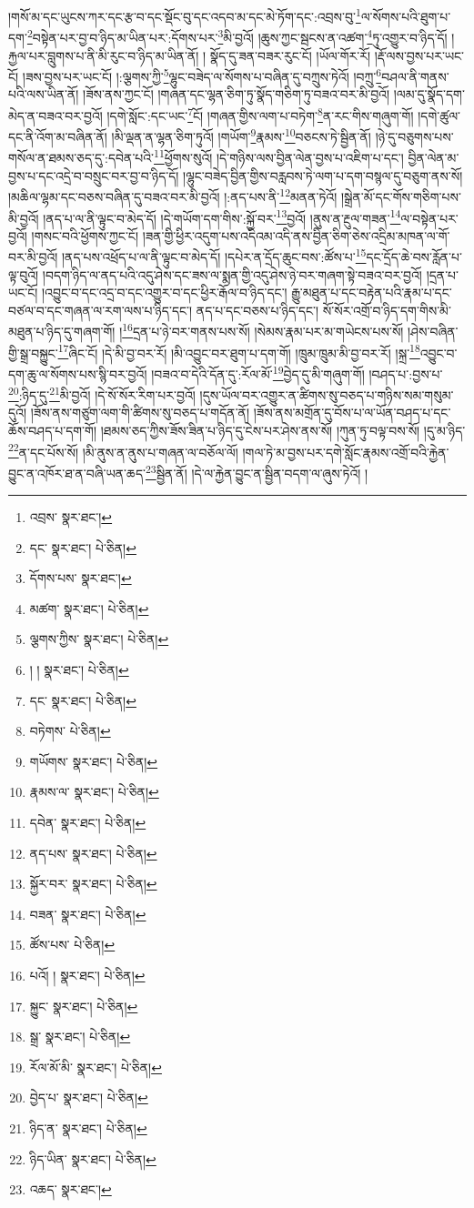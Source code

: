 །གསོ་མ་དང་ཡུངས་ཀར་དང་རྩ་བ་དང་སྡོང་བུ་དང་འདབ་མ་དང་མེ་ཏོག་དང་:འབྲས་བུ་\footnote{འབྲས་  སྣར་ཐང་། }ལ་སོགས་པའི་ཐུག་པ་དག་\footnote{དང་  སྣར་ཐང་།  པེ་ཅིན། }བསྟེན་པར་བྱ་བ་ཉིད་མ་ཡིན་པར་:དོགས་པར་\footnote{དོགས་པས་  སྣར་ཐང་། }མི་བྱའོ། །ཆུས་ཀྱང་སྦངས་ན་འཚག་\footnote{མཚག་  སྣར་ཐང་།  པེ་ཅིན། }ཏུ་འགྱུར་བ་ཉིད་དོ། །རྐྱལ་པར་བླུགས་པ་ནི་མི་རུང་བ་ཉིད་མ་ཡིན་ནོ། །
སྣོད་དུ་ཟན་བཟར་རུང་ངོ། །ཡོལ་གོར་རོ། །རྡོ་ལས་བྱས་པར་ཡང་ངོ། །ཟས་བྱས་པར་ཡང་ངོ། །:ལྕགས་ཀྱི་\footnote{ལྕགས་ཀྱིས་  སྣར་ཐང་།  པེ་ཅིན། }ལྷུང་བཟེད་ལ་སོགས་པ་བཞིན་དུ་བཀྲུས་ཏེའོ། །བཀྲུ་\footnote{། །  སྣར་ཐང་།  པེ་ཅིན། }བཤལ་ནི་གནས་པའི་ལས་ཡིན་ནོ། །ཟོས་ནས་ཀྱང་ངོ། །གཞན་དང་ལྷན་ཅིག་ཏུ་སྣོད་གཅིག་ཏུ་བཟའ་བར་མི་བྱའོ། །ལམ་དུ་སྣོད་དག་མེད་ན་བཟའ་བར་བྱའོ། །དགེ་སློང་:དང་ཡང་\footnote{དང་  སྣར་ཐང་།  པེ་ཅིན། }ངོ། །གཞན་གྱིས་ལག་པ་བཏེག་\footnote{བཏེགས་  པེ་ཅིན། }ན་རང་གིས་གཞུག་གོ། །དགེ་ཚུལ་དང་ནི་འོག་མ་བཞིན་ནོ། །མི་ལྡན་ན་ལྷན་ཅིག་ཏུའོ། །གཡོག་\footnote{གཡོགས་  སྣར་ཐང་།  པེ་ཅིན། }རྣམས་\footnote{རྣམས་ལ་  སྣར་ཐང་།  པེ་ཅིན། }བཅངས་ཏེ་སྦྱིན་ནོ། །ཉེ་དུ་བཅུགས་པས་གསོལ་ན་ཐམས་ཅད་དུ་:དབེན་པའི་\footnote{དབེན་  སྣར་ཐང་།  པེ་ཅིན། }ཕྱོགས་སུའོ། །དེ་གཉིས་ལས་བྱིན་ལེན་བྱས་པ་འཇིག་པ་དང་། བྱིན་ལེན་མ་བྱས་པ་དང་འདྲེ་བ་བསྲུང་བར་བྱ་བ་ཉིད་དོ། །ལྷུང་བཟེད་བྱིན་གྱིས་བརླབས་ཏེ་ལག་པ་དག་བསྙལ་དུ་བཅུག་ནས་སོ། །མཆིལ་ལྷམ་དང་བཅས་བཞིན་དུ་བཟའ་བར་མི་བྱའོ། །:ནད་པས་ནི་\footnote{ནད་པས་  སྣར་ཐང་།  པེ་ཅིན། }མནན་ཏེའོ། །སྒྲེན་མོ་དང་གོས་གཅིག་པས་མི་བྱའོ། །ནད་པ་ལ་ནི་ལྟུང་བ་མེད་དོ། །དེ་གཡོག་དག་གིས་:སྐྱོ་བར་\footnote{སྐྱོར་བར་  སྣར་ཐང་།  པེ་ཅིན། }བྱའོ། །ནུས་ན་རྔུལ་གཟན་\footnote{བཟན་  སྣར་ཐང་།  པེ་ཅིན། }ལ་བསྟེན་པར་བྱའོ། །གསང་བའི་ཕྱོགས་ཀྱང་ངོ། །ཟན་གྱི་ཕྱིར་འདུག་པས་འདིའམ་འདི་ནས་བྱིན་ཅིག་ཅེས་འདྲིམ་མཁན་ལ་གོ་བར་མི་བྱའོ། །ནད་པས་འཕྲོད་པ་ལ་ནི་ལྟུང་བ་མེད་དོ། །དཔེར་ན་དྲོད་ཆུང་བས་:ཚོས་པ་\footnote{ཚོས་པས་  པེ་ཅིན། }དང་དྲོད་ཆེ་བས་རློན་པ་ལྟ་བུའོ། །བདག་ཉིད་ལ་ནད་པའི་འདུ་ཤེས་དང་ཟས་ལ་སྨན་གྱི་འདུ་ཤེས་ཉེ་བར་གཞག་སྟེ་བཟའ་བར་བྱའོ། །དྲན་པ་ཡང་ངོ། །འབྱུང་བ་དང་འདྲ་བ་དང་འགྱུར་བ་དང་ཕྱིར་རྒོལ་བ་ཉིད་དང་། རྒྱུ་མཐུན་པ་དང་བརྟེན་པའི་རྣམ་པ་དང་བཙལ་བ་དང་གཞན་ལ་རག་ལས་པ་ཉིད་དང་། ནད་པ་དང་བཅས་པ་ཉིད་དང་། སོ་སོར་འགྲོ་བ་ཉིད་དག་གིས་མི་མཐུན་པ་ཉིད་དུ་གཞག་གོ། །\footnote{པའོ། །  སྣར་ཐང་།  པེ་ཅིན། }དྲན་པ་ཉེ་བར་གནས་པས་སོ། །སེམས་རྣམ་པར་མ་གཡེངས་པས་སོ། །ཤེས་བཞིན་གྱི་སྒྲ་བསྐྱུང་\footnote{སྐྱུང་  སྣར་ཐང་།  པེ་ཅིན། }ཞིང་ངོ། །དེ་མི་བྱ་བར་རོ། །མི་འབྱུང་བར་ཐུག་པ་དག་གོ། །ཁྲུམ་ཁྲུམ་མི་བྱ་བར་རོ། །སྐྲ་\footnote{སྒྲ་  སྣར་ཐང་།  པེ་ཅིན། }འབྱུང་བ་དག་ཆུ་ལ་སོགས་པས་སྙི་བར་བྱའོ། །བཟའ་བ་དེའི་དོན་དུ་:རོལ་མོ་\footnote{རོལ་མོ་མི་  སྣར་ཐང་།  པེ་ཅིན། }བྱེད་དུ་མི་གཞུག་གོ། །བཤད་པ་:བྱས་པ་\footnote{བྱེད་པ་  སྣར་ཐང་།  པེ་ཅིན། }:ཉིད་དུ་\footnote{ཉིད་ན་  སྣར་ཐང་།  པེ་ཅིན། }མི་བྱའོ། །དེ་སོ་སོར་རིག་པར་བྱའོ། །དུས་ཡོལ་བར་འགྱུར་ན་ཚིགས་སུ་བཅད་པ་གཉིས་སམ་གསུམ་དུའོ། །ཟོས་ནས་གཙུག་ལག་གི་ཚིགས་སུ་བཅད་པ་གདོན་ནོ། །ཟོས་ནས་མགྲོན་དུ་བོས་པ་ལ་ཡོན་བཤད་པ་དང་ཆོས་བཤད་པ་དག་གོ། །ཐམས་ཅད་ཀྱིས་ཟོས་ཟིན་པ་ཉིད་དུ་ངེས་པར་ཤེས་ནས་སོ། །ཀུན་ཏུ་བལྟ་བས་སོ། །དུ་མ་ཉིད་\footnote{ཉིད་ཡིན་  སྣར་ཐང་།  པེ་ཅིན། }ན་དང་པོས་སོ། །མི་ནུས་ན་ནུས་པ་གཞན་ལ་བཅོལ་ལོ། །གལ་ཏེ་མ་བྱས་པར་དགེ་སློང་རྣམས་འགྲོ་བའི་རྐྱེན་བྱུང་ན་འཁོར་ཐ་ན་བཞི་ཡན་ཆད་\footnote{འཆད་  སྣར་ཐང་། }སྦྱིན་ནོ། །དེ་ལ་རྐྱེན་བྱུང་ན་སྦྱིན་བདག་ལ་ཞུས་ཏེའོ། །
